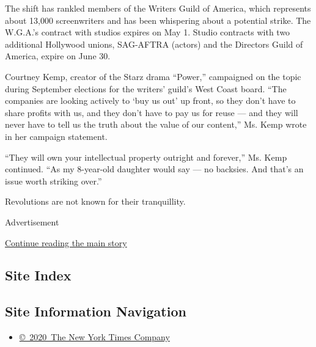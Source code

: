 The shift has rankled members of the Writers Guild of America, which
represents about 13,000 screenwriters and has been whispering about a
potential strike. The W.G.A.'s contract with studios expires on May 1.
Studio contracts with two additional Hollywood unions, SAG-AFTRA
(actors) and the Directors Guild of America, expire on June 30.

Courtney Kemp, creator of the Starz drama ``Power,'' campaigned on the
topic during September elections for the writers' guild's West Coast
board. ``The companies are looking actively to `buy us out' up front, so
they don't have to share profits with us, and they don't have to pay us
for reuse --- and they will never have to tell us the truth about the
value of our content,'' Ms. Kemp wrote in her campaign statement.

``They will own your intellectual property outright and forever,'' Ms.
Kemp continued. ``As my 8-year-old daughter would say --- no backsies.
And that's an issue worth striking over.''

Revolutions are not known for their tranquillity.

Advertisement

\protect\hyperlink{after-bottom}{Continue reading the main story}

\hypertarget{site-index}{%
\subsection{Site Index}\label{site-index}}

\hypertarget{site-information-navigation}{%
\subsection{Site Information
Navigation}\label{site-information-navigation}}

\begin{itemize}
\tightlist
\item
  \href{https://help.nytimes3xbfgragh.onion/hc/en-us/articles/115014792127-Copyright-notice}{©~2020~The
  New York Times Company}
\end{itemize}

